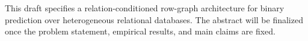 This draft specifies a relation-conditioned row-graph architecture for
binary prediction over heterogeneous relational databases. The abstract
will be finalized once the problem statement, empirical results, and main
claims are fixed.
